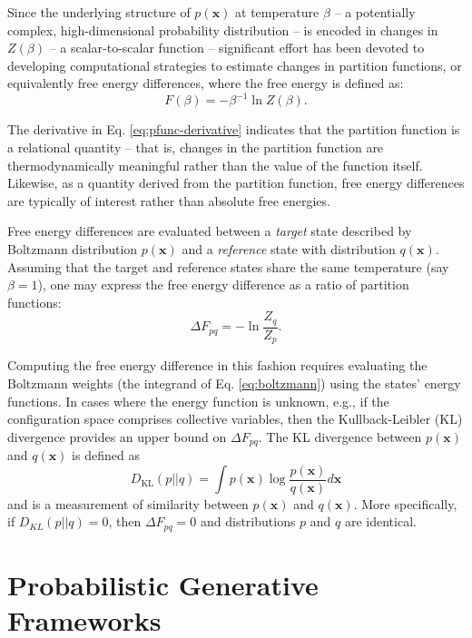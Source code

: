 \documentclass[%
 aip,
 amsmath,amssymb,
 reprint,%
]{revtex4-1}
\begin{document}
Since the underlying structure of $p(\mathbf{x})$ at temperature $\beta$ -- a potentially complex, high-dimensional probability distribution -- is encoded in changes in $Z(\beta)$ -- a scalar-to-scalar function -- significant effort has been devoted to developing computational strategies to estimate changes in partition functions, or equivalently free energy differences, where the free energy is defined as:
\begin{equation}
    F(\beta) = -\beta^{-1} \ln Z(\beta).
\end{equation}

The derivative in Eq. \ref{eq:pfunc-derivative} indicates that the partition function is a relational quantity -- that is, changes in the partition function are thermodynamically meaningful rather than the value of the function itself. Likewise, as a quantity derived from the partition function, free energy differences are typically of interest rather than absolute free energies.

Free energy differences are evaluated between a {\it target} state described by Boltzmann distribution $p(\mathbf{x})$ and a {\it reference} state with distribution $q(\mathbf{x})$. Assuming that the target and reference states share the same temperature (say $\beta=1$), one may express the free energy difference as a ratio of partition functions:
\begin{equation}
    \label{eq:fep-identity}
    \Delta F_{pq} = - \ln \frac{Z_q}{Z_p}.
\end{equation}

Computing the free energy difference in this fashion requires evaluating the Boltzmann weights (the integrand of Eq. \ref{eq:boltzmann}) using the states' energy functions. In cases where the energy function is unknown, e.g., if the configuration space comprises collective variables, then the Kullback-Leibler (KL) divergence provides an upper bound on $\Delta F_{pq}$\cite{tfep-2021,lrex-2022}. The KL divergence between $p(\mathbf{x})$ and $q(\mathbf{x})$ is defined as
\begin{equation} 
\label{eq:KLD} 
D_{\mathrm{KL}}(p||q) = \int p(\mathbf{x}) \log \frac{p(\mathbf{x})}{q(\mathbf{x})} d\mathbf{x}
\end{equation} 
and is a measurement of similarity between $p(\mathbf{x})$ and $q(\mathbf{x})$. More specifically, if $D_{KL}(p||q)=0$, then $\Delta F_{pq}=0$ and distributions $p$ and $q$ are identical.

\section{Probabilistic Generative Frameworks}
\label{sec:gen-frameworks}
\end{document}
